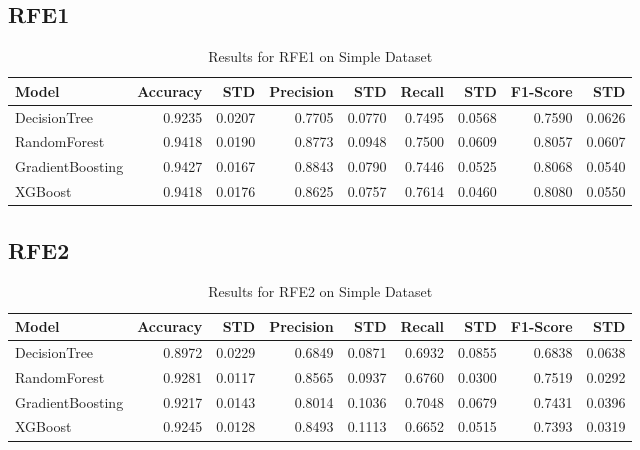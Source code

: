 \documentclass{article}
\begin{document}
\subsection{RFE1}
\begin{table}[h!]
\centering
\caption{Results for RFE1 on Simple Dataset}
\begin{tabular}{l|rr|rr|rr|rr}
\hline
Model & Accuracy & STD & Precision & STD & Recall & STD & F1-Score & STD \\
\hline
DecisionTree & 0.9235 & 0.0207 & 0.7705 & 0.0770 & 0.7495 & 0.0568 & 0.7590 & 0.0626 \\
RandomForest & 0.9418 & 0.0190 & 0.8773 & 0.0948 & 0.7500 & 0.0609 & 0.8057 & 0.0607 \\
GradientBoosting & 0.9427 & 0.0167 & 0.8843 & 0.0790 & 0.7446 & 0.0525 & 0.8068 & 0.0540 \\
XGBoost & 0.9418 & 0.0176 & 0.8625 & 0.0757 & 0.7614 & 0.0460 & 0.8080 & 0.0550 \\
\hline
\end{tabular}
\end{table}

\subsection{RFE2}
\begin{table}[h!]
\centering
\caption{Results for RFE2 on Simple Dataset}
\begin{tabular}{l|rr|rr|rr|rr}
\hline
Model & Accuracy & STD & Precision & STD & Recall & STD & F1-Score & STD \\
\hline
DecisionTree & 0.8972 & 0.0229 & 0.6849 & 0.0871 & 0.6932 & 0.0855 & 0.6838 & 0.0638 \\
RandomForest & 0.9281 & 0.0117 & 0.8565 & 0.0937 & 0.6760 & 0.0300 & 0.7519 & 0.0292 \\
GradientBoosting & 0.9217 & 0.0143 & 0.8014 & 0.1036 & 0.7048 & 0.0679 & 0.7431 & 0.0396 \\
XGBoost & 0.9245 & 0.0128 & 0.8493 & 0.1113 & 0.6652 & 0.0515 & 0.7393 & 0.0319 \\
\hline
\end{tabular}
\end{table}
\end{document}
